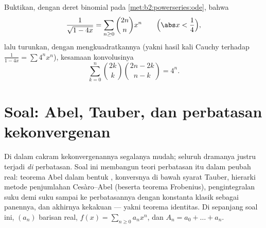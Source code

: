 \begin{exercise}[$\star\star\star$]\label{exo:b2:powerseries:12}
Buktikan, dengan deret binomial pada
\cref{met:b2:powerseries:ode}, bahwa
\[
\frac{1}{\sqrt{1 - 4x}} = \sum_{n\geq0}\binom{2n}{n}x^n
\qquad \Bigl(\abs x < \frac14\Bigr),
\]
lalu turunkan, dengan mengkuadratkannya (yakni hasil kali Cauchy
terhadap $\frac{1}{1-4x} = \sum 4^nx^n$), kesamaan konvolusinya
\[
\sum_{k=0}^{n}\binom{2k}{k}\binom{2n-2k}{n-k} = 4^n .
\]
\end{exercise}

\section{Soal: Abel, Tauber, dan perbatasan kekonvergenan}

\begin{problem}\label{pb:b2:powerseries:1}
Di dalam cakram kekonvergenannya segalanya mudah; seluruh
dramanya justru terjadi \emph{di} perbatasan. Soal ini membangun teori
perbatasan itu dalam peubah real: teorema Abel dalam bentuk
, konversnya di bawah syarat Tauber, hierarki metode
penjumlahan Cesàro--Abel (beserta teorema Frobenius),
pengintegralan suku demi suku sampai ke perbatasannya dengan
konstanta klasik sebagai panennya, dan akhirnya kekakuan  --- yakni teorema
identitas.
Di sepanjang soal ini, $(a_n)$ barisan real, $f(x) = \sum_{n\geq0}
a_nx^n$, dan $A_n = a_0 + \dots + a_n$.


\end{problem}
